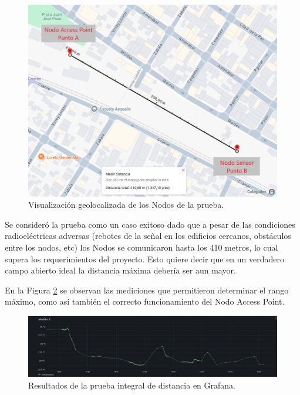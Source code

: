 \begin{figure}[H]
	\centering
	\includegraphics[scale=0.5]{./Figures/Pruebas/prueba_distancia_mapa.png}
	\caption{Visualización geolocalizada de los Nodos de la prueba.}
\label{fig:PruebaDistancia}
\end{figure}

Se consideró la prueba como un caso exitoso dado que a pesar de las condiciones radioeléctricas adversas (rebotes de la señal en los edificios cercanos, obstáculos entre los nodos, etc) los Nodos se comunicaron hasta los 410 metros, lo cual supera los requerimientos del proyecto. Esto quiere decir que en un verdadero campo abierto ideal la distancia máxima debería ser aun mayor.

En la Figura \ref{fig:PruebaDistanciaGrafana} se observan las mediciones que permitieron determinar el rango máximo, como así también el correcto funcionamiento del Nodo Access Point.

\begin{figure}[H]
    \centering
    \includegraphics[width=1\linewidth]{Figures/Pruebas/prueba_distancia_grafana.png}
    \caption{Resultados de la prueba integral de distancia en Grafana.}
    \label{fig:PruebaDistanciaGrafana}
\end{figure}

